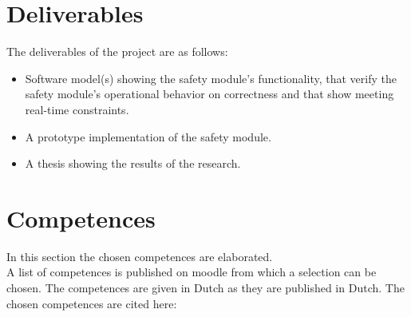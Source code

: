 \documentclass[12pt]{scrreprt}
\begin{document}

\section{Deliverables}
\label{Deliverables}
The deliverables of the project are as follows:

\begin{itemize}
    \item Software model(s) showing the safety module's functionality, that verify the safety module's operational behavior on correctness and that show meeting real-time constraints.
    \item A prototype implementation of the safety module.
    \item A thesis showing the results of the research.
\end{itemize}

\section{Competences}
\label{Competences}
In this section the chosen competences are elaborated. \\
A list of competences is published on moodle from which a selection can be chosen. The competences are given in Dutch as they are published in Dutch. The chosen competences are cited here: 
\end{document}
